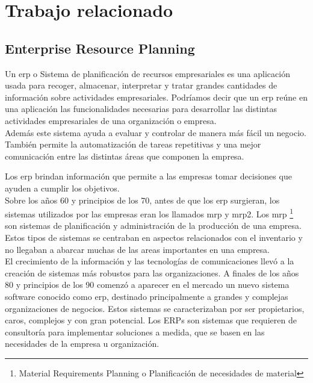 \chapter{Trabajo relacionado}


\section[Enterprise Resource Planning]{Enterprise Resource Planning}

Un \acrfull{erp} o Sistema de planificación de recursos empresariales es una aplicación usada para recoger, almacenar,
interpretar y tratar grandes cantidades de información sobre actividades empresariales.
Podríamos decir que un \acrshort{erp} reúne en una aplicación las funcionalidades necesarias para desarrollar las distintas actividades empresariales de una organización o empresa.\\

Además este sistema ayuda a evaluar y controlar de manera más fácil un negocio. También permite la automatización de tareas repetitivas y una mejor comunicación entre las distintas áreas que componen la empresa.

Los \acrshort{erp} brindan información que permite a las empresas tomar decisiones que ayuden a cumplir los objetivos.\\

Sobre los años 60 y principios de los 70, antes de que los \acrshort{erp} surgieran, los sistemas utilizados por las empresas eran los llamados \acrshort{mrp} y \acrshort{mrp2}.
Los \acrshort{mrp} \footnote{Material Requirements Planning o Planificación de necesidades de material} son sistemas de planificación y administración de la producción de una empresa. Estos tipos de sistemas se centraban en aspectos relacionados con el inventario y no llegaban a abarcar muchas de las areas importantes en una empresa.\\



El crecimiento de la información y las tecnologías de comunicaciones llevó a la creación de sistemas más robustos para 
las organizaciones. A finales de los años 80 y principios de los 90 comenzó a aparecer en el mercado un nuevo sistema 
software conocido como \acrshort{erp}, destinado principalmente a grandes y complejas organizaciones de negocios. Estos sistemas 
se caracterizaban por ser propietarios, caros, complejos y con gran potencial.
Los ERPs son sistemas que requieren de consultoría para implementar soluciones a medida, que se basen en las necesidades de la empresa u organización. \cite{erp1}


